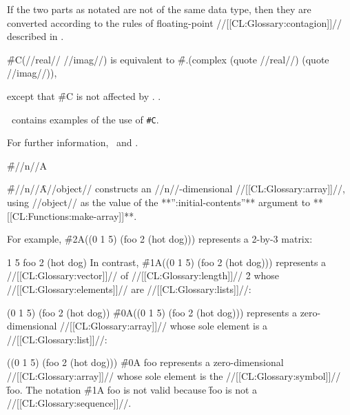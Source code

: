If the two parts as notated are not of the same data type, then they are converted  according to the rules of floating-point //[[CL:Glossary:contagion]]// described in \secref\NumericContagionRules.

\f{\#C(//real// //imag//)} is equivalent to  \f{\#.(complex (quote //real//) (quote //imag//))},

except that \f{\#C} is not affected by . .

\Thenextfigure\ contains examples of the use of {\tt \#C}.


For further information,  \seesection\PrintingComplexes\ and \secref\SyntaxOfComplexes.

\endsubsubsection%

  

\f{\#//n//A}

\f{\#//n//\f{A}//object//} constructs an //n//-dimensional //[[CL:Glossary:array]]//, using //object// as the value of the **'':initial-contents''** argument to **[[CL:Functions:make-array]]**.

For example, \f{\#2A((0 1 5) (foo 2 (hot dog)))} represents a 2-by-3 matrix:

       1       5
 foo     2       (hot dog) \endcode In contrast, \f{\#1A((0 1 5) (foo 2 (hot dog)))}  represents a //[[CL:Glossary:vector]]// of //[[CL:Glossary:length]]// \f{2}  whose //[[CL:Glossary:elements]]// are //[[CL:Glossary:lists]]//:

\code
 (0 1 5) (foo 2 (hot dog)) \endcode \f{\#0A((0 1 5) (foo 2 (hot dog)))} represents a zero-dimensional //[[CL:Glossary:array]]// whose sole element is a //[[CL:Glossary:list]]//:

\code
 ((0 1 5) (foo 2 (hot dog))) \endcode \f{\#0A foo} represents  a zero-dimensional //[[CL:Glossary:array]]// whose sole element is the  //[[CL:Glossary:symbol]]// \f{foo}. The notation \f{\#1A foo} is not valid because \f{foo} is not a //[[CL:Glossary:sequence]]//.

